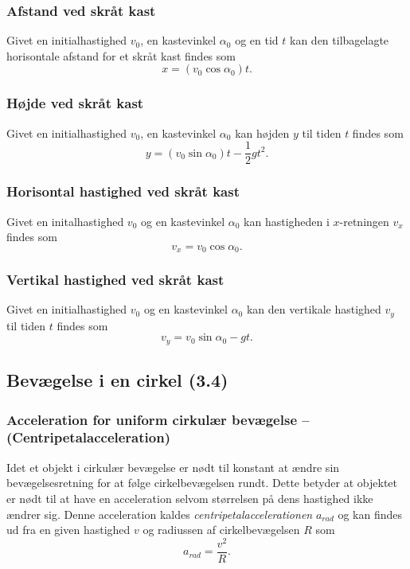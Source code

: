 \subsubsection{Afstand ved skråt kast} \label{afs:kasafs}
Givet en initialhastighed $v_0$, en kastevinkel $\alpha_0$ og en tid $t$ kan den tilbagelagte horisontale afstand for et skråt kast findes som
\[ 
  x = (v_0 \cos \alpha_0)t
.\]


\subsubsection{Højde ved skråt kast} \label{afs:kashøj}
Givet en initialhastighed $v_0$, en kastevinkel $\alpha_0$ kan højden $y$ til tiden $t$ findes som
\[ 
y = (v_0 \sin \alpha_0)t - \frac{1}{2}gt^2
.\]


\subsubsection{Horisontal hastighed ved skråt kast} \label{afs:kashhas}
Givet en initalhastighed $v_0$ og en kastevinkel $\alpha_0$ kan hastigheden i $x$-retningen $v_x$ findes som
\[ 
v_x = v_0 \cos \alpha_0
.\]


\subsubsection{Vertikal hastighed ved skråt kast} \label{afs:kasvhas}
Givet en initialhastighed $v_0$ og en kastevinkel $\alpha_0$ kan den vertikale hastighed $v_y$ til tiden $t$ findes som
\[ 
v_y = v_0 \sin \alpha_0 - gt
.\]

\subsection{Bevægelse i en cirkel (3.4)}

\subsubsection{Acceleration for uniform cirkulær bevægelse – (Centripetalacceleration)} \label{afs:acccp}
Idet et objekt i cirkulær bevægelse er nødt til konstant at ændre sin bevægelsesretning for at følge cirkelbevægelsen rundt. Dette betyder at objektet er nødt til at have en acceleration selvom størrelsen på dens hastighed ikke ændrer sig. Denne acceleration kaldes \textit{centripetalaccelerationen} $a_{rad}$ og kan findes ud fra en given hastighed $v$ og radiussen af cirkelbevægelsen $R$ som
\[ 
a_{rad} = \frac{v^2}{R}
.\]

